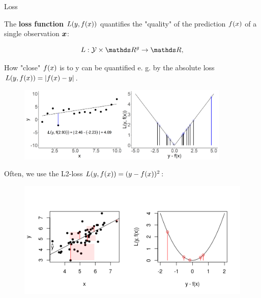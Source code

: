 \documentclass[11pt,compress,t,notes=noshow, xcolor=table]{beamer}
\begin{document}
\begin{vbframe}{Loss}

The \textbf{loss function} $L(y, f(x))$ quantifies the "quality" of the prediction $f(x)$ of a single observation $\bm{x}$:

    $$
    L: \Yspace \times \R^g \to \R,
    $$

\lz

How "close" $f(x)$ is to y can be quantified e. g. by the absolute loss $L(y, f(x)) = |f(x) - y|$.


\vfill


\begin{center}
\begin{figure}[!b]
\includegraphics[width=0.9\textwidth]{figure/ml-basic_riskmin-1-loss.png}
\end{figure}
\end{center}

\framebreak

Often, we use the L2-loss $L(y, f(x)) = (y - f(x))^2$:

\begin{center}
\begin{figure}[!b]
\includegraphics[width=\textwidth]{figure_man/loss_quadratic_plot1.png}
\end{figure}
\end{center}



\end{vbframe}
\end{document}
